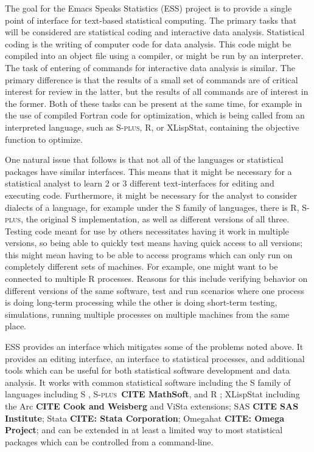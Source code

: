 \documentclass{article}
\newcommand*{\Splus}{\textsc{S-plus}}
\begin{document}
The goal for the Emacs Speaks Statistics (ESS) project is to provide a
single point of interface for text-based statistical computing.  The
primary tasks that will be considered are statistical coding and
interactive data analysis.  Statistical coding is the writing of
computer code for data analysis.  This code might be compiled into an
object file using a compiler, or might be run by an interpreter.  The
task of entering of commands for interactive data analysis is similar.
The primary difference is that the results of a small set of commands
are of critical interest for review in the latter, but the results of
all commands are of interest in the former.  Both of these tasks can
be present at the same time, for example in the use of compiled
Fortran code for optimization, which is being called from an
interpreted language, such as \Splus, R, or XLispStat, containing the
objective function to optimize.

One natural issue that follows is that not all of the languages or
statistical packages have similar interfaces.  This means that it
might be necessary for a statistical analyst to learn 2 or 3 different
text-interfaces for editing and executing code.  Furthermore, it might
be necessary for the analyst to consider dialects of a language, for
example under the S family of languages, there is R, \Splus, the
original S implementation, as well as different versions of all three.
Testing code meant for use by others necessitates having it work in
multiple versions, so being able to quickly test means having quick
access to all versions; this might mean having to be able to access
programs which can only run on completely different sets of machines.
For example, one might want to be connected to multiple R processes.
Reasons for this include verifying behavior on different versions of
the same software, test and run scenarios where one process is doing
long-term processing while the other is doing short-term testing,
simulations, running multiple processes on multiple machines from the
same place.

ESS provides an interface which mitigates some of the problems noted
above.  It provides an editing interface, an interface to statistical
processes, and additional tools which can be useful for both
statistical software development and data analysis.  It works with
common statistical software including the S family of languages
including S \citep{BecRCW88,ChaJH92,ChaJ98}, \Splus\ \textbf{CITE
  MathSoft}, and R \citep{ihak:gent:1996}; XLispStat \citep{Tier90}
including the Arc \textbf{CITE Cook and Weisberg} and 
ViSta \citep{youn:fald:mcfa:1992} extensions; SAS \textbf{CITE
  SAS Institute}; Stata \textbf{CITE: Stata Corporation}; Omegahat
\textbf{CITE: Omega Project}; and can be extended in at least a
limited way to most statistical packages which can be controlled from
a command-line.
\end{document}
